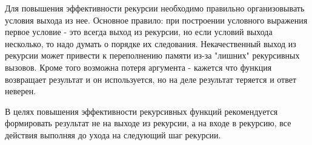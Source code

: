 \documentclass[a4paper,12pt]{article}
\begin{document}
	Для повышения эффективности рекурсии необходимо правильно организовывать условия выхода из нее. Основное правило: при построении условного выражения первое условие  - это всегда выход из рекурсии, но если условий выхода несколько, то надо думать о порядке их следования. Некачественный выход из рекурсии может привести к переполнению памяти из-за "лишних" рекурсивных вызовов. Кроме того возможна потеря аргумента - кажется что функция возвращает результат и он используется, но на деле результат теряется и ответ неверен.
	
	В целях повышения эффективности рекурсивных функций рекомендуется формировать результат не на выходе из рекурсии, а на входе в рекурсию, все действия выполняя до ухода на следующий шаг рекурсии.
	
\end{document}
